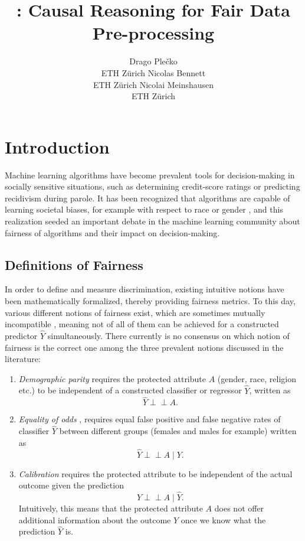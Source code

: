 \documentclass[
  nojss]{jss}
\author{
Drago Plečko\\ETH Zürich \And Nicolas Bennett\\ETH Zürich \And Nicolai Meinshausen\\ETH Zürich
}
\title{\pkg{fairadapt}: Causal Reasoning for Fair Data Pre-processing}
\providecommand{\tightlist}{%
  \setlength{\itemsep}{0pt}\setlength{\parskip}{0pt}}
\begin{document}
\hypertarget{introduction}{%
\section{Introduction}\label{introduction}}

Machine learning algorithms have become prevalent tools for
decision-making in socially sensitive situations, such as determining
credit-score ratings or predicting recidivism during parole. It has been
recognized that algorithms are capable of learning societal biases, for
example with respect to race \citep{larson2016recidivism} or gender
\citep{lambrecht2019algorithmic, blau2003pay}, and this realization
seeded an important debate in the machine learning community about
fairness of algorithms and their impact on decision-making.

\hypertarget{definitions-of-fairness}{%
\subsection{Definitions of Fairness}\label{definitions-of-fairness}}

In order to define and measure discrimination, existing intuitive
notions have been mathematically formalized, thereby providing fairness
metrics. To this day, various different notions of fairness exist, which
are sometimes mutually incompatible \citep{corbett2018measure}, meaning
not of all of them can be achieved for a constructed predictor
\(\widehat{Y}\) simultaneously. There currently is no consensus on which
notion of fairness is the correct one among the three prevalent notions
discussed in the literature:

\begin{enumerate}
\def\labelenumi{(\arabic{enumi})}
\tightlist
\item
  \emph{Demographic parity} \citep{darlington1971fairness} requires the
  protected attribute \(A\) (gender, race, religion etc.) to be
  independent of a constructed classifier or regressor \(\widehat{Y}\),
  written as \[\widehat{Y} {\perp\!\!\!\perp}A.\]
\item
  \emph{Equality of odds} \citep{hardt2016eosl}, requires equal false
  positive and false negative rates of classifier \(\widehat{Y}\)
  between different groups (females and males for example) written as
  \[\widehat{Y} {\perp\!\!\!\perp}A \mid Y.\]
\item
  \emph{Calibration} \citep{chouldechova2017fair} requires the protected
  attribute to be independent of the actual outcome given the prediction
  \[Y {\perp\!\!\!\perp}A \mid \widehat{Y}.\] Intuitively, this means
  that the protected attribute \(A\) does not offer additional
  information about the outcome \(Y\) once we know what the prediction
  \(\widehat{Y}\) is.
\end{enumerate}
\end{document}
